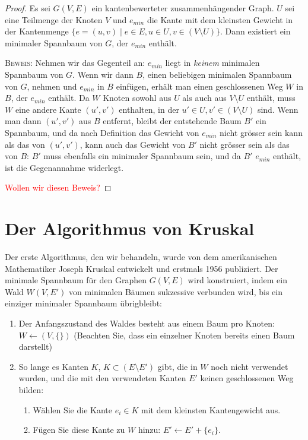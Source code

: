 \documentclass[12pt,a4paper]{report}
\theoremstyle{break}
\theoremstyle{plain}
\newtheorem{proof}{Satz}[section]
\begin{document}
\begin{proof}\label{minimalkante}
  Es sei $G(V,E)$ ein kantenbewerteter
  zusammenh\"{a}ngender Graph. $U$ sei eine Teilmenge der Knoten $V$ und
  $e_{min}$ die Kante mit dem kleinsten Gewicht in der Kantenmenge
  $\{e=(u,v) \mid e\in E, u\in U, v\in (V\!\setminus\!U) \}$. Dann existiert ein
  minimaler Spannbaum von $G$, der $e_{min}$ enth\"{a}lt.

 \bigskip\noindent\textsc{Beweis:} Nehmen wir das Gegenteil an: $e_{min}$
liegt in \emph{keinem} minimalen Spannbaum von $G$. Wenn wir dann $B$,
einen beliebigen minimalen Spannbaum von $G$, nehmen und $e_{min}$ in $B$
einf\"{u}gen, erh\"{a}lt man einen geschlossenen Weg $W$ in $B$, der
$e_{min}$ enth\"{a}lt. Da $W$ Knoten sowohl aus $U$ als auch aus
$V\!\setminus\!U$ enth\"{a}lt, muss $W$ eine andere Kante $(u', v')$
enthalten, in der $u' \in U, v'\in (V\!\setminus\!U)$ sind. Wenn man
dann $(u',v')$ aus $B$ entfernt, bleibt der entstehende Baum $B'$ ein Spannbaum, und da nach
Definition das Gewicht von $e_{min}$ nicht gr\"{o}sser sein kann als
das von $(u',v')$, kann auch das Gewicht von $B'$ nicht
gr\"{o}sser sein als das von $B$: $B'$ muss ebenfalls ein minimaler
Spannbaum sein, und da $B'$ $e_{min}$ enth\"{a}lt, ist die
Gegenannahme widerlegt.

\textcolor{red}{Wollen wir diesen Beweis?}
\end{proof} 

\section{Der Algorithmus von Kruskal}

Der erste Algorithmus, den wir behandeln, wurde von dem
amerikanischen Mathematiker Joseph Kruskal entwickelt und erstmals
1956 publiziert. Der minimale Spannbaum f\"{u}r den Graphen $G(V,E)$
wird konstruiert, indem ein Wald $W(V, E')$ von minimalen B\"{a}umen
sukzessive verbunden wird, bis ein einziger minimaler Spannbaum
\"ubrigbleibt:

\begin{enumerate}
\item Der Anfangszustand des Waldes besteht aus einem Baum pro Knoten:
  $W \gets (V, \{\})$ (Beachten Sie, dass ein
  einzelner Knoten bereits einen Baum darstellt)
\item So lange es Kanten $K$, $K\subset (E\setminus{E'})$ gibt, die in $W$ noch nicht
  verwendet wurden, und die mit den verwendeten Kanten $E'$ keinen
  geschlossenen Weg bilden:
\begin{enumerate}
\item W\"{a}hlen Sie die Kante $e_i\in K$ mit dem kleinsten
  Kantengewicht aus.
\item F\"{u}gen Sie diese Kante zu $W$ hinzu: $E' \gets E'+\{e_i\}$.
\end{enumerate}
\end{enumerate}
\end{document}

